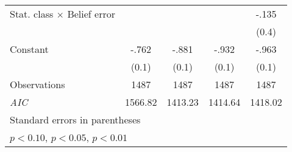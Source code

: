 \begin{table}[htbp]
\begin{tabular}{l*{4}{c}}
Stat. class $\times$ Belief error&                  &                  &                  &    -.135         \\
                &                  &                  &                  &    (0.4)         \\
Constant        &    -.762\sym{***}&    -.881\sym{***}&    -.932\sym{***}&    -.963\sym{***}\\
                &    (0.1)         &    (0.1)         &    (0.1)         &    (0.1)         \\
\hline
Observations    &     1487         &     1487         &     1487         &     1487         \\
\textit{AIC}    &  1566.82         &  1413.23         &  1414.64         &  1418.02         \\
\hline\hline
\multicolumn{5}{l}{\footnotesize Standard errors in parentheses}\\
\multicolumn{5}{l}{\footnotesize \sym{*} \(p<0.10\), \sym{**} \(p<0.05\), \sym{***} \(p<0.01\)}\\
\end{tabular}
\end{table}
